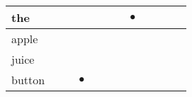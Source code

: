 \documentclass[landscape]{article}
\newcommand{\ssp}{\hspace{2pt}}
\newcommand{\mex}{\cellcolor{g}$\bullet$}
\begin{document}
\begin{tabular}{|l|p{10pt}|p{10pt}|p{10pt}|p{10pt}|p{10pt}|p{10pt}|p{10pt}|p{10pt}|p{10pt}|p{10pt}|p{10pt}|}
\hline
\ssp \cellcolor{ref6}the \ssp&\hspace{2pt}&\hspace{2pt}&\hspace{2pt}&\hspace{2pt}&\hspace{2pt}&\hspace{2pt}&\hspace{2pt}\mex&\hspace{2pt}&\hspace{2pt}&\hspace{2pt}&\hspace{2pt}\\
\hline
\ssp apple \ssp&\hspace{2pt}&\hspace{2pt}&\hspace{2pt}&\hspace{2pt}&\hspace{2pt}&\hspace{2pt}&\hspace{2pt}&\hspace{2pt}&\hspace{2pt}&\hspace{2pt}&\hspace{2pt}\\
\hline
\ssp juice \ssp&\hspace{2pt}&\hspace{2pt}&\hspace{2pt}&\hspace{2pt}&\hspace{2pt}&\hspace{2pt}&\hspace{2pt}&\hspace{2pt}&\hspace{2pt}&\hspace{2pt}&\hspace{2pt}\\
\hline
\ssp \cellcolor{ref2}button \ssp&\hspace{2pt}&\hspace{2pt}&\hspace{2pt}\mex&\hspace{2pt}&\hspace{2pt}&\hspace{2pt}&\hspace{2pt}&\hspace{2pt}&\hspace{2pt}&\hspace{2pt}&\hspace{2pt}\\

\end{tabular}
\end{document}

